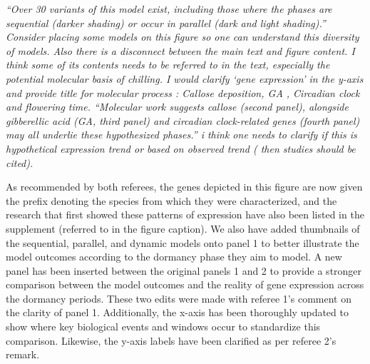 \documentclass[11pt]{article}
\begin{document}
\emph{``Over 30 variants of this model exist, including those where the phases are sequential (darker shading) or occur in parallel (dark and light shading).'' Consider placing some models on this figure so one can understand this diversity of models. Also there is a disconnect between the main text and figure content. I think some of its contents needs to be referred to in the text, especially the potential molecular basis of chilling. I would clarify `gene expression' in the y-axis and provide title for molecular process : Callose deposition, GA , Circadian clock and flowering time. ``Molecular work suggests callose (second panel), alongside gibberellic acid (GA, third panel) and circadian clock-related genes (fourth panel) may all underlie these hypothesized phases.'' i think one needs to clarify if this is hypothetical expression trend or based on observed trend ( then studies should be cited).}

As recommended by both referees, the genes depicted in this figure are now given the prefix denoting the species from which they were characterized, and the research that first showed these patterns of expression have also been listed in the supplement (referred to in the figure caption). We also have added thumbnails of the sequential, parallel, and dynamic models onto panel 1 to better illustrate the model outcomes according to the dormancy phase they aim to model. A new panel has been inserted between the original panels 1 and 2 to provide a stronger comparison between the model outcomes and the reality of gene expression across the dormancy periods. These two edits were made with referee 1's comment on the clarity of panel 1. Additionally, the x-axis has been thoroughly updated to show where key biological events and windows occur to standardize this comparison. Likewise, the y-axis labels have been clarified as per referee 2's remark.



\end{document}
